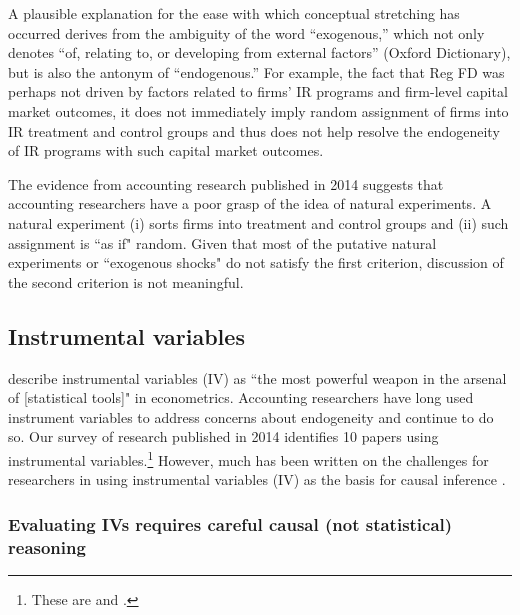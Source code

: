 \documentclass[11pt,reqno,titlepage]{amsart}
\begin{document}
\begin{doublespace}
A plausible explanation for the ease with which conceptual stretching has occurred derives from the ambiguity of the word ``exogenous,'' which not only denotes  ``of, relating to, or developing from external factors'' (Oxford Dictionary), but is also the antonym of ``endogenous.''
For example, the fact that Reg FD was perhaps not driven by factors related to firms' IR programs and firm-level capital market outcomes, it does not immediately imply random assignment of firms into IR treatment and control groups and thus does not help resolve the endogeneity of IR programs with such capital market outcomes.

The evidence from accounting research published in 2014 suggests that accounting researchers have a poor grasp of the idea of natural experiments.
A natural experiment (i) sorts firms into treatment and control groups and (ii) such assignment is ``as if" random.
Given that most of the putative natural experiments or ``exogenous shocks" do not satisfy the first criterion, discussion of the second criterion is not meaningful.


\subsection{Instrumental variables}
\citet[p.114]{Angrist:2008vk} describe instrumental variables (IV) as ``the most powerful weapon in the arsenal of [statistical tools]" in econometrics. 
Accounting researchers have long used instrument variables to address concerns about endogeneity \citep{Larcker:2010fq} and continue to do so.  Our survey of research published in 2014 identifies 10 papers using instrumental variables.\footnote{These are \citet{Cannon:2014im,Cohen:2014jl,Kim:2014fm,Vermeer:2014bs,Fox:2014io,Guedhami:2013cj,Houston:2014hv,deFranco:2014ct,Erkens:2014hj} and \citet{Correia:2014fp}.}
However, much has been written on the challenges for researchers in using instrumental variables (IV) as the basis for causal inference \citep[e.g.,][]{Roberts:2013cz}. 

\subsubsection{Evaluating IVs requires careful causal (not statistical) reasoning}


\end{doublespace}
\end{document}
